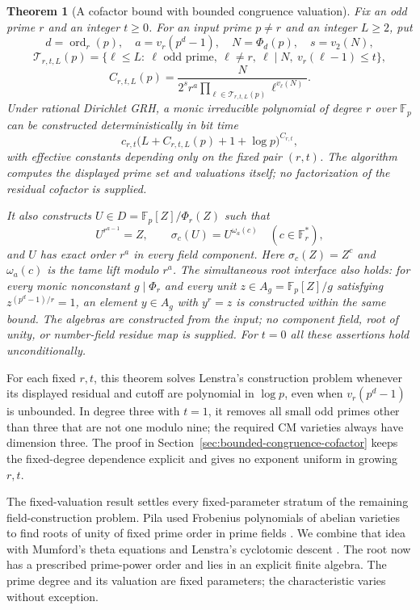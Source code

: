 \documentclass[11pt]{article}
\newtheorem{theorem}{Theorem}[section]
\theoremstyle{definition}
\theoremstyle{remark}
\begin{document}
\begin{theorem}[A cofactor bound with bounded congruence valuation]
\label{thm:bounded-congruence-cofactor}
Fix an odd prime $r$ and an integer $t\geq0$.
For an input prime $p\ne r$ and an integer $L\geq2$, put
\[
 d=\operatorname{ord}_r(p),\quad a=v_r(p^d-1),\quad
 N=\Phi_d(p),\quad s=v_2(N),
\]
\[
 \mathcal T_{r,t,L}(p)=
 \{\ell\leq L:\ \ell\text{ odd prime},\ \ell\ne r,\
       \ell\mid N,\ v_r(\ell-1)\leq t\},
\]
\[
 C_{r,t,L}(p)=
 \frac{N}{2^s r^a
       \prod_{\ell\in\mathcal T_{r,t,L}(p)}\ell^{v_\ell(N)}}.
\]
Under rational Dirichlet GRH, a monic irreducible polynomial of degree $r$
over $\mathbb F_p$ can be constructed deterministically in bit time
\[
 c_{r,t}\bigl(L+C_{r,t,L}(p)+1+\log p\bigr)^{C_{r,t}},
\]
with effective constants depending only on the fixed pair $(r,t)$.
The algorithm computes the displayed prime set and valuations itself;
no factorization of the residual cofactor is supplied.

It also constructs $U\in D=\mathbb F_p[Z]/\Phi_r(Z)$ such that
\[
 U^{r^{a-1}}=Z,\qquad
 \sigma_c(U)=U^{\omega_a(c)}\quad(c\in\mathbb F_r^*),
\]
and $U$ has exact order $r^a$ in every field component.
Here $\sigma_c(Z)=Z^c$ and $\omega_a(c)$ is the tame lift modulo $r^a$.
The simultaneous root interface also holds: for every monic nonconstant
$g\mid\Phi_r$ and every unit $z\in A_g=\mathbb F_p[Z]/g$ satisfying
$z^{(p^d-1)/r}=1$, an element $y\in A_g$ with $y^r=z$ is constructed
within the same bound.  The algebras are constructed from the input; no
component field, root of unity, or number-field residue map is supplied.
For $t=0$ all these assertions hold unconditionally.
\end{theorem}

For each fixed \(r,t\), this theorem solves Lenstra's construction problem
whenever its displayed residual and cutoff are polynomial in \(\log p\),
even when \(v_r(p^d-1)\) is unbounded. In degree three with \(t=1\), it
removes all small odd primes other than three that are not one modulo nine;
the required CM varieties always have dimension three. The proof in
Section~\ref{sec:bounded-congruence-cofactor} keeps the fixed-degree
dependence explicit and gives no exponent uniform in growing \(r,t\).

The fixed-valuation result settles every fixed-parameter stratum of the
remaining field-construction problem. Pila used Frobenius polynomials
of abelian varieties to find roots of unity of fixed prime order in
prime fields \citep[Theorem~D, author p.~2; Section~5,
pp.~14--18]{Pila1990}. We combine that idea with Mumford's theta
equations \citep[Section~6, pp.~83--84]{Mumford1967} and
Lenstra's cyclotomic descent \citep[Theorems~(3.1), (5.1),
and (5.2), pp.~334--340]{Lenstra1991}. The root now has a
prescribed prime-power order and lies in an explicit finite algebra.
The prime degree and its valuation are fixed parameters; the
characteristic varies without exception.
\end{document}
